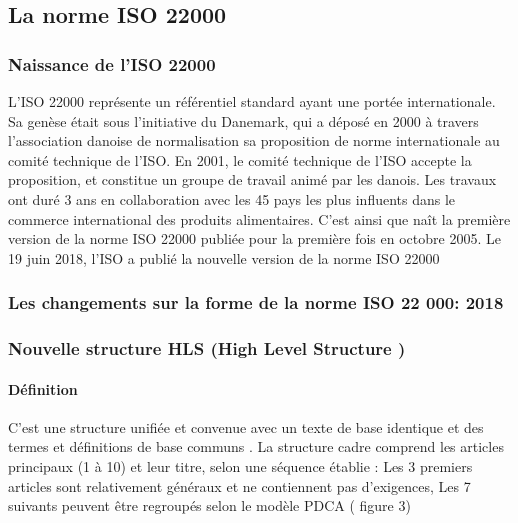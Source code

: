 \begin{spacing}{1.2}
\subsection{La norme ISO 22000}

\subsubsection{Naissance de l’ISO 22000}
L’ISO 22000  représente un référentiel standard ayant une portée internationale. Sa genèse était sous l’initiative du Danemark, qui a déposé en 2000 à travers  l’association danoise de normalisation sa proposition de norme internationale au comité technique de l’ISO. En 2001, le comité technique de l’ISO accepte la proposition, et constitue un groupe de travail animé par les danois. Les travaux ont duré 3 ans en collaboration avec les 45 pays les plus influents dans le commerce international des produits alimentaires. C’est ainsi que naît la première version de la norme ISO 22000 publiée pour la première fois en octobre 2005. Le 19 juin 2018, l’ISO a publié la nouvelle version de la norme ISO 22000
\subsubsection{Les changements sur la forme de la norme ISO 22 000: 2018}

\subsubsection{Nouvelle structure  HLS (High Level Structure )}
\paragraph{Définition}

C’est une structure unifiée et convenue avec un texte de base identique et des termes et définitions de base communs . La structure cadre comprend les articles principaux (1 à 10) et leur titre, selon une séquence établie : Les 3 premiers articles sont relativement généraux et ne contiennent pas d’exigences, Les 7 suivants peuvent être regroupés selon le modèle PDCA ( figure 3)


\end{spacing}

